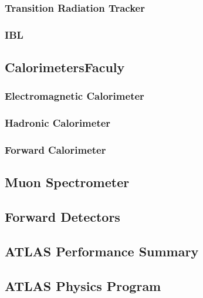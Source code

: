 \subsubsection*{Transition Radiation Tracker}



\subsubsection*{IBL}


\subsection{CalorimetersFaculy}

\subsubsection*{Electromagnetic Calorimeter}


\subsubsection*{Hadronic Calorimeter}


\subsubsection*{Forward Calorimeter}


\subsection{Muon Spectrometer}


\subsection{Forward Detectors}


\subsection{ATLAS Performance Summary}


\subsection{ATLAS Physics Program}